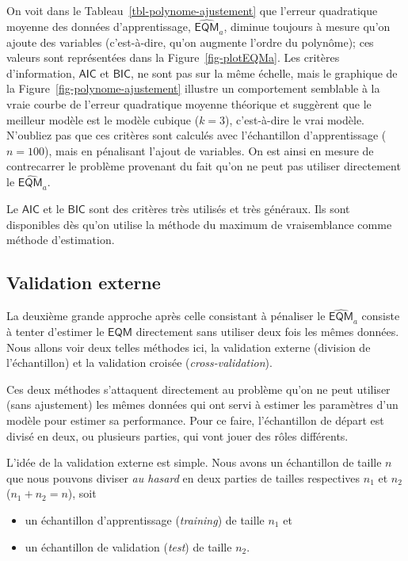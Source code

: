 \documentclass[
  11pt,
  letterpaper,
]{scrbook}
\providecommand{\tightlist}{%
  \setlength{\itemsep}{0pt}\setlength{\parskip}{0pt}}\usepackage{longtable,booktabs,array}
\theoremstyle{definition}
\theoremstyle{remark}
\begin{document}
On voit dans le Tableau~\ref{tbl-polynome-ajustement} que l'erreur
quadratique moyenne des données d'apprentissage,
\(\widehat{\mathsf{EQM}}_a\), diminue toujours à mesure qu'on ajoute des
variables (c'est-à-dire, qu'on augmente l'ordre du polynôme); ces
valeurs sont représentées dans la Figure~\ref{fig-plotEQMa}. Les
critères d'information, \(\mathsf{AIC}\) et \(\mathsf{BIC}\), ne sont
pas sur la même échelle, mais le graphique de la
Figure~\ref{fig-polynome-ajustement} illustre un comportement semblable
à la vraie courbe de l'erreur quadratique moyenne théorique et suggèrent
que le meilleur modèle est le modèle cubique (\(k=3\)), c'est-à-dire le
vrai modèle. N'oubliez pas que ces critères sont calculés avec
l'échantillon d'apprentissage (\(n=100\)), mais en pénalisant l'ajout de
variables. On est ainsi en mesure de contrecarrer le problème provenant
du fait qu'on ne peut pas utiliser directement le
\(\widehat{\mathsf{EQM}}_a\).

Le \(\mathsf{AIC}\) et le \(\mathsf{BIC}\) sont des critères très
utilisés et très généraux. Ils sont disponibles dès qu'on utilise la
méthode du maximum de vraisemblance comme méthode d'estimation.

\hypertarget{validation-externe}{%
\subsection{Validation externe}\label{validation-externe}}

La deuxième grande approche après celle consistant à pénaliser le
\(\widehat{\mathsf{EQM}}_a\) consiste à tenter d'estimer le
\(\mathsf{EQM}\) directement sans utiliser deux fois les mêmes données.
Nous allons voir deux telles méthodes ici, la validation externe
(division de l'échantillon) et la validation croisée
(\emph{cross-validation}).

Ces deux méthodes s'attaquent directement au problème qu'on ne peut
utiliser (sans ajustement) les mêmes données qui ont servi à estimer les
paramètres d'un modèle pour estimer sa performance. Pour ce faire,
l'échantillon de départ est divisé en deux, ou plusieurs parties, qui
vont jouer des rôles différents.

L'idée de la validation externe est simple. Nous avons un échantillon de
taille \(n\) que nous pouvons diviser \emph{au hasard} en deux parties
de tailles respectives \(n_1\) et \(n_2\) (\(n_1+n_2=n\)), soit

\begin{itemize}
\tightlist
\item
  un échantillon d'apprentissage (\emph{training}) de taille \(n_1\) et
\item
  un échantillon de validation (\emph{test}) de taille \(n_2\).
\end{itemize}
\end{document}
